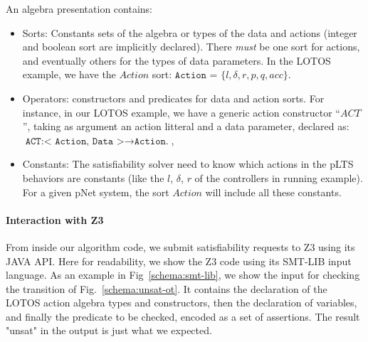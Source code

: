 \documentclass{lncs/llncs}
\newcommand{\TODO}[1]{\textcolor{red}{\textbf{[TODO:#1]}}}
\newcommand{\OTvar}{\texttt}
\begin{document}
An algebra presentation contains:


\begin{itemize}
	\item Sorts: Constants sets of the algebra or types of the data
          and actions (integer and boolean sort are implicitly
          declared).  There \emph{must} be one sort for actions, and
          eventually others for the types of data
          parameters. In the LOTOS example, 
          we have the $Action$ sort: $\OTvar{Action = } \{ l, \delta,
          r, p, q, acc \} .$ 

	\item Operators:
          constructors and predicates for data and action sorts. For
          instance, in our LOTOS example, we
          have a generic action constructor ``$ACT$'', taking as
          argument an action litteral and a data parameter, declared as:
          $\OTvar{ACT:}\OTvar{< Action, Data >} \rightarrow \OTvar{Action.}$, 
        \item Constants: The satisfiability solver need to know which
          actions in the pLTS behaviors are constants (like the $l$, $\delta$, 
          $r$ of the controllers in running example). 
          For a given pNet system, the sort $Action$ will include all
          these constants.
\end{itemize}

\paragraph{Interaction with Z3}
From inside our algorithm code, we submit satisfiability requests to
Z3 using its JAVA API. Here for readability, we
show the Z3 code using its SMT-LIB input language. As an
example in
Fig~\ref{schema:smt-lib}, we show the input for checking the
transition of Fig.~\ref{schema:unsat-ot}. It contains the declaration
of the LOTOS action algebra types 
and constructors, then the declaration of variables, and finally the
predicate to be checked, encoded as a set of assertions.
The result "unsat" in the output is just what we expected.   
\end{document}
